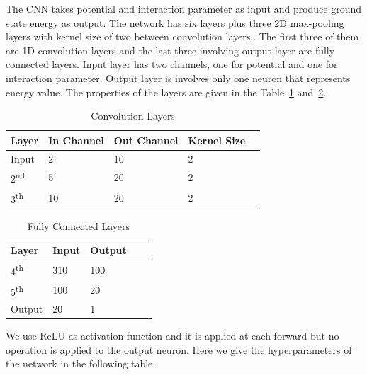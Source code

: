 \documentclass[a4paper,times,hidelinks,12pt]{article}
\begin{document}
The CNN takes potential and interaction parameter as input and produce ground state energy as output. The network has six layers plus three 2D max-pooling layers with kernel size of two between convolution layers.. The first three of them are 1D convolution layers and the last three involving output layer are fully connected layers. Input layer has two channels, one for potential and one for interaction parameter. Output layer is involves only one neuron that represents energy value. The properties of the layers are given in the Table~\ref{tb:conv_layers} and~\ref{tb:fully_layers}.

\begin{table}[H]
    \centering
    \caption{Convolution Layers}
    \label{tb:conv_layers}
    \begin{tabular}{|l|l|l|l|l|} \hline
    \textbf{Layer}        & \textbf{In Channel} & \textbf{Out Channel}   & \textbf{Kernel Size}  \\ \hline
    Input                 & 2                   & 10                     & 2                     \\ \hline
    2\textsuperscript{nd} & 5                   & 20                     & 2                     \\ \hline
    3\textsuperscript{th} & 10                  & 20                     & 2                     \\ \hline
    \end{tabular}
\end{table}

\begin{table}[H]
    \centering
    \caption{Fully Connected Layers}
    \label{tb:fully_layers}
    \begin{tabular}{|l|l|l|l|l|} \hline
    \textbf{Layer}        & \textbf{Input}      & \textbf{Output}    \\ \hline
    4\textsuperscript{th} & 310                 & 100                \\ \hline
    5\textsuperscript{th} & 100                 & 20                 \\ \hline
    Output                & 20                  & 1                  \\ \hline
    \end{tabular}
\end{table}

We use ReLU as activation function and it is applied at each forward but no operation is applied to the output neuron. Here we give the hyperparameters of the network in the following table.
\end{document}
